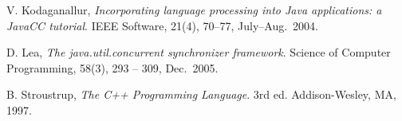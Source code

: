 \documentclass[preprint]{sigplanconf}
\begin{document}
\begin{thebibliography}{}
    V. Kodaganallur, \emph{Incorporating language processing into Java 
    applications: a JavaCC tutorial}. IEEE Software, 21(4), 70--77,
    July--Aug.~2004. 

    D. Lea, \emph{The java.util.concurrent synchronizer framework}. Science of 
    Computer Programming, 58(3), 293 -- 309, Dec.~2005.

    B. Stroustrup, \emph{The C++ Programming Language}. 3rd ed. Addison-Wesley,
    MA, 1997.

\end{thebibliography}
\end{document}
